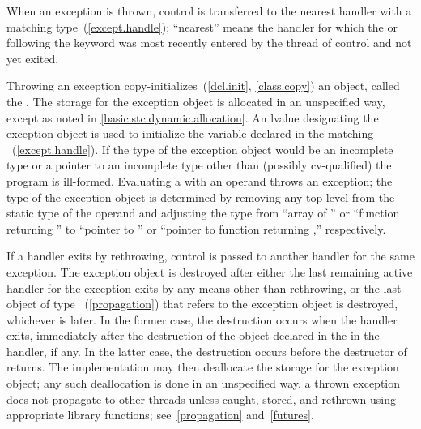 \pnum
{}%
%
%
When an exception is thrown, control is transferred to the nearest handler with
a matching type~(\ref{except.handle}); ``nearest'' means the handler
for which the
 or
following the
keyword was most recently entered by the thread of control and not yet exited.

\pnum
{}%
%
Throwing an exception
copy-initializes~(\ref{dcl.init}, \ref{class.copy}) an object,
called the
.
The storage for the exception object is allocated in an unspecified way,
except as noted in \ref{basic.stc.dynamic.allocation}.
An lvalue designating the exception object
is used to initialize the
variable declared in the matching
~(\ref{except.handle}).
If the type of the exception object would
be an incomplete type or a pointer to an incomplete
type other than (possibly cv-qualified)
 the program is ill-formed.
Evaluating a  with an operand throws an
exception; the type of the exception object is determined by removing
any top-level  from the static type of the
operand and adjusting the type from ``array of '' or ``function
returning '' to ``pointer to '' or ``pointer to function returning
,'' respectively.

\pnum
{}%
If a handler exits by rethrowing, control is passed to another handler for
the same exception.
The exception object is destroyed after either
the last remaining active handler for the exception exits by
any means other than
rethrowing, or the last object of type ~(\ref{propagation})
that refers to the exception object is destroyed, whichever is later. In the former
case, the destruction occurs when the handler exits, immediately after the destruction
of the object declared in the  in the handler, if any.
In the latter case, the destruction occurs before the destructor of 
returns.
The implementation may then
deallocate the storage for the exception object; any such deallocation
is done in an unspecified way.
\enternote a thrown exception does not
propagate to other threads unless caught, stored, and rethrown using
appropriate library functions; see~\ref{propagation} and~\ref{futures}. \exitnote

